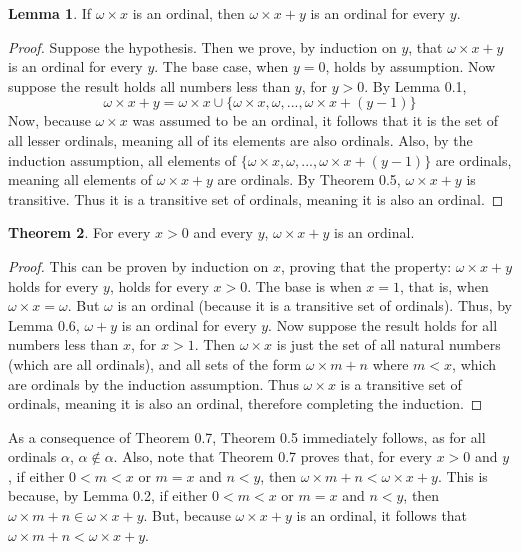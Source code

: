 \documentclass{article}
\theoremstyle{definition}
\newtheorem{theorem}{Theorem}[section]
\newtheorem{lemma}[theorem]{Lemma}
\begin{document}
\begin{lemma} If $\omega\times x$ is an ordinal, then $\omega\times x+y$ is an ordinal for every $y$.
\end{lemma}
\begin{proof}
Suppose the hypothesis. Then we prove, by induction on $y$, that $\omega\times x+y$ is an ordinal for every $y$. The 
base case, when $y=0$, holds by assumption. Now suppose the result holds all numbers less than $y$, for $y>0$. By 
Lemma 0.1, 
\[ \omega\times x+y=\omega\times x\cup\{\omega\times x,\omega,...,\omega\times x+(y-1)\} \] Now, because 
$\omega\times x$ was assumed to be an ordinal, it follows that it is the set of all lesser ordinals, meaning all of its elements are also ordinals. 
Also, by the induction assumption, all elements of $\{\omega\times x,\omega,...,\omega\times x+(y-1)\}$ are ordinals, meaning 
all elements of $\omega\times x+y$ are ordinals. By Theorem 0.5, $\omega\times x+y$ is transitive. Thus it is a transitive set of 
ordinals, meaning it is also an ordinal.
\end{proof}

\begin{theorem} For every $x>0$ and every $y$, $\omega\times x+y$ is an ordinal.
\end{theorem}
\begin{proof}
This can be proven by induction on $x$, proving that the property: $\omega\times x+y$ holds for every $y$, holds for every $x>0$. 
The base is when $x=1$, that is, when 
$\omega\times x=\omega$. But $\omega$ is an ordinal (because it is a transitive set of ordinals). Thus, by Lemma 0.6,
$\omega+y$ is an ordinal for every $y$. Now suppose the result holds for all numbers less than $x$, for $x>1$. Then 
$\omega\times x$ is just the set of all natural numbers (which are all ordinals), and all sets of the form $\omega\times m+n$ where $m<x$, 
which are ordinals by the induction assumption. Thus $\omega\times x$ is a transitive set of ordinals, meaning it is also an ordinal, 
therefore completing the induction.
\end{proof}

As a consequence of Theorem 0.7, Theorem 0.5 immediately follows, as for all ordinals $\alpha$, $\alpha\notin\alpha$. Also, note that 
Theorem 0.7 proves that, for every $x>0$ and $y$, if either $0<m<x$ or $m=x$ and $n<y$, then $\omega\times m+n<\omega\times x+y$. This is 
because, by Lemma 0.2, if either $0<m<x$ or $m=x$ and $n<y$, then $\omega\times m+n\in\omega\times x+y$. But, because 
$\omega\times x+y$ is an ordinal, it follows that $\omega\times m+n<\omega\times x+y$.
\end{document}
